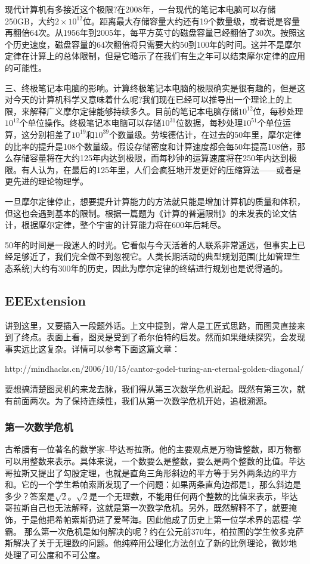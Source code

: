 \documentclass{ctexart}
\begin{document}
	现代计算机有多接近这个极限?在2008年，一台现代的笔记本电脑可以存储250GB，大约$ 2 \times 10^{12} $位。距离最大存储容量大约还有19个数量级，或者说是容量再翻倍64次。从1956年到2005年，每平方英寸的磁盘容量已经翻倍了30次。按照这个历史速度，磁盘容量的64次翻倍将只需要大约50到100年的时间。这并不是摩尔定律在计算上的总体限制，但是它暗示了在我们有生之年可以结束摩尔定律的应用的可能性。
	
	三、终极笔记本电脑的影响。计算终极笔记本电脑的极限确实是很有趣的，但是这对今天的计算机科学又意味着什么呢?我们现在已经可以推导出一个理论上的上限，来解释广义摩尔定律能够持续多久。目前的笔记本电脑存储$ 10^{12} $位，每秒处理$ 10^{12} $个单位操作。终极笔记本电脑可以存储$ 10^{31} $位数据，每秒处理$ 10^{51} $个单位运算，这分别相差了$ 10^{19} $和$ 10^{39} $个数量级。劳埃德估计，在过去的50年里，摩尔定律的比率的提升是108个数量级。假设存储密度和计算速度都会每50年提高108倍，那么存储容量将在大约125年内达到极限，而每秒钟的运算速度将在250年内达到极限。有人认为，在最后的125年里，人们会疯狂地开发更好的压缩算法——或者是更先进的理论物理学。
	
	一旦摩尔定律停止，想要提升计算能力的方法就只能是增加计算机的质量和体积，但这也会遇到基本的限制。根据一篇题为《计算的普遍限制》的未发表的论文估计，根据摩尔定律，整个宇宙的计算能力将在600年后耗尽。
	
	50年的时间是一段迷人的时光。它看似与今天活着的人联系非常遥远，但事实上已经足够近了，我们完全做不到忽视它。人类长期活动的典型规划范围(比如管理生态系统)大约有300年的历史，因此为摩尔定律的终结进行规划也是说得通的。
	\subsection{EEExtension}
	讲到这里，又要插入一段题外话。上文中提到，常人是工匠式思路，而图灵直接来到了终点。表面上看，图灵是受到了希尔伯特的启发。然而如果继续探究，会发现事实远比这复杂。详情可以参考下面这篇文章：
	
	http://mindhacks.cn/2006/10/15/cantor-godel-turing-an-eternal-golden-diagonal/
	
	要想搞清楚图灵机的来龙去脉，我们得从第三次数学危机说起。既然有第三次，就有前面两次。为了保持连续性，我们从第一次数学危机开始，追根溯源。
	\subsubsection{第一次数学危机}
	古希腊有一位著名的数学家--毕达哥拉斯。他的主要观点是万物皆整数，即万物都可以用整数来表示。具体来说，一个数要么是整数，要么是两个整数的比值。毕达哥拉斯又提出了勾股定理，也就是直角三角形斜边的平方等于另外两条边的平方和。它的一个学生希帕索斯发现了一个问题：如果两条直角边都是1，那么斜边是多少？答案是$ \sqrt{2} $。$ \sqrt{2} $是一个无理数，不能用任何两个整数的比值来表示，毕达哥拉斯自己也无法解释，这就是第一次数学危机。另外，既然解释不了，就要掩饰，于是他把希帕索斯扔进了爱琴海。因此他成了历史上第一位学术界的恶棍--学霸。
		那么第一次危机是如何解决的呢？约在公元前370年，柏拉图的学生攸多克萨斯解决了关于无理数的问题。他纯粹用公理化方法创立了新的比例理论，微妙地
	处理了可公度和不可公度。
\end{document}
